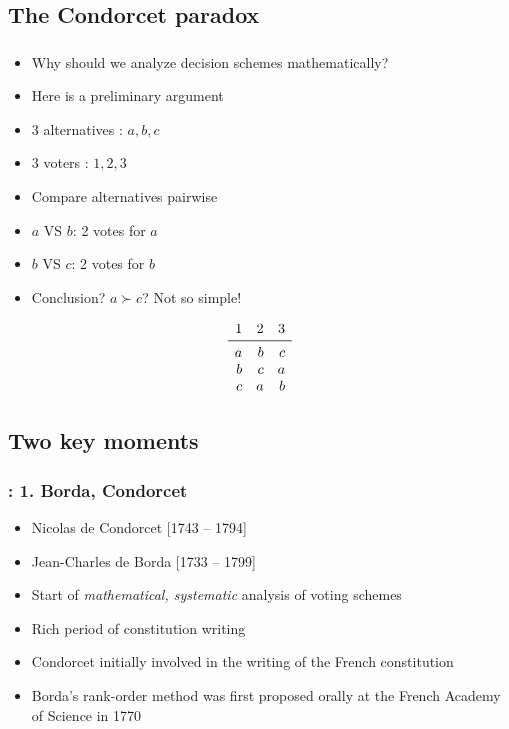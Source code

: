 \documentclass[french, english]{beamer}
\begin{document}
\subsection{The Condorcet paradox}
\begin{frame}
	\frametitle{\subsecname}
	\begin{itemize}
		\item Why should we analyze decision schemes mathematically?
		\item Here is a preliminary argument
		\item 3 alternatives : $a, b, c$
		\item 3 voters : $1, 2, 3$
		\item Compare alternatives pairwise
		\item $a$ VS $b$: 2 votes for $a$
		\item $b$ VS $c$: 2 votes for $b$
		\item Conclusion? \pause $a \succ c$? Not so simple!
	\end{itemize}
	\begin{equation}
		\begin{array}{rrr}
			1	&2	&3\\
			\midrule
			a	&b	&c\\
			b	&c	&a\\
			c	&a	&b\\
		\end{array}
	\end{equation}
\end{frame}

\subsection{Two key moments}
\begin{frame}
	\frametitle{\subsecname: 1. Borda, Condorcet}
	\begin{itemize}
		\item Nicolas de Condorcet [1743 – 1794]
		\item Jean-Charles de Borda [1733 – 1799]
		\item Start of \emph{mathematical, systematic} analysis of voting schemes
		\item Rich period of constitution writing
		\item Condorcet initially involved in the writing of the French constitution
		\item Borda’s rank-order method was first proposed orally at the French Academy of Science in 1770 \citep{suzumura_introduction_2002}
	\end{itemize}
\end{frame}
\end{document}
